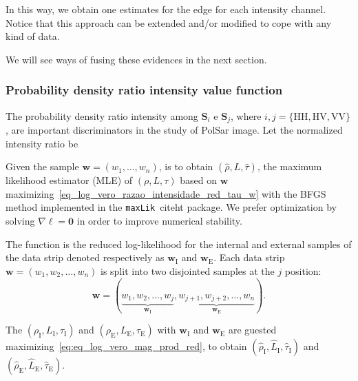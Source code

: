 \documentclass[journal]{IEEEtran}
\begin{document}
In this way, we obtain one estimates for the edge for each intensity channel.
Notice that this approach can be extended and/or modified to cope with any kind of data.

We will see ways of fusing these evidences in the next section.

\subsubsection{Probability density ratio intensity value function}
The probability density ratio intensity among $\mathbf{S}_i$ e $\mathbf{S}_j$, where $i,j=\{\text{HH},\text{HV}, \text{VV}\}$, are important discriminators in the study of PolSar image. Let the normalized intensity ratio be  
 
Given the sample $\bm w = (w_1,\dots,w_n)$, is to obtain $(\widehat \rho, L, \widehat \tau)$, the maximum likelihood estimator (MLE) of $(\rho, L, \tau)$ based on $\bm w$ maximizing~\eqref{eq_log_vero_razao_intensidade_red_tau_w} with the BFGS method implemented in the \texttt{maxLik}~cite{ht} package. We prefer optimization by solving $\nabla\ell=\bm 0$ in order to improve numerical stability.

The function is the reduced log-likelihood for the internal and external samples of the data strip denoted respectively as $\bm w_\text{I}$ and $\bm w_\text{E}$. Each data strip $\bm w = (w_1,w_2,\dots,w_n)$ is split into two disjointed samples at the $j$ position:
$$
\bm w = (\underbrace{w_1,w_2,\dots,w_j}_{\bm w_\text{I}}, 
\underbrace{w_{j+1}, w_{j+2},\dots,w_n}_{\bm w_\text{E}}).
$$

The $(\rho_\text{I},L_\text{I}, \tau_\text{I})$ and $(\rho_\text{E},L_\text{E}, \tau_\text{E})$ with $\bm w_\text{I}$ and $\bm w_\text{E}$ are guested maximizing~\eqref{eq:eq_log_vero_mag_prod_red}, to obtain $(\widehat{\rho}_\text{I}, \widehat{L}_\text{I}, \widehat{\tau}_\text{I})$ and $(\widehat{\rho}_\text{E}, \widehat{L}_\text{E}, \widehat{\tau}_\text{E})$.
\end{document}

